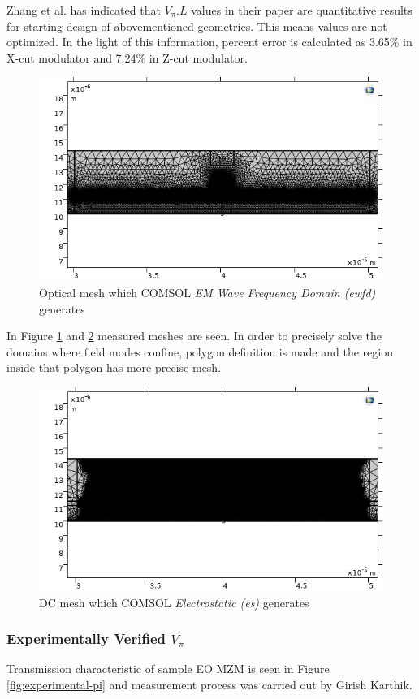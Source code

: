     Zhang et al. \cite{21} has indicated that $V_{\pi}.L$ values in their paper are quantitative results for starting design of abovementioned geometries. This means values are not optimized. In the light of this information, percent error is calculated as 3.65\% in X-cut modulator and 7.24\% in Z-cut modulator. 

    \begin{figure}[h!]
        \centering
        \includegraphics[width=0.50\linewidth]{optical-mesh.png}
        \caption{Optical mesh which COMSOL \textit{EM Wave Frequency Domain (ewfd)} generates} 
        \label{fig:optical-mesh}
    \end{figure}

    In Figure \ref{fig:optical-mesh} and \ref{fig:dc-mesh} measured meshes are seen. In order to precisely solve the domains where field modes confine, polygon definition is made and the region inside that polygon has more precise mesh.
    
    \begin{figure}[h!]
        \centering
        \includegraphics[width=0.50\linewidth]{dc-mesh.png}
        \caption{DC mesh which COMSOL \textit{Electrostatic (es)} generates} 
        \label{fig:dc-mesh}
    \end{figure}

    \subsubsection{Experimentally Verified $V_\pi$}

    Transmission characteristic of sample EO MZM is seen in Figure \ref{fig:experimental-pi} and measurement process was carried out by Girish Karthik. 

